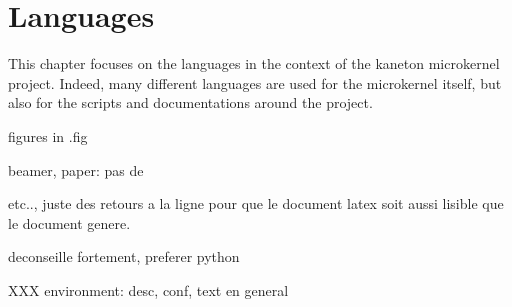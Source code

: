 %
%
%
%
%
%

%
%

\chapter{Languages}
\label{chapter:languages}

This chapter focuses on the languages in the context of the kaneton microkernel
project. Indeed, many different languages are used for the microkernel itself,
but also for the scripts and documentations around the project.

\newpage

%
%











figures in .fig

beamer, %
paper: pas de \par etc.., juste des retours a la ligne pour que le document
latex soit aussi lisible que le document genere.



deconseille fortement, preferer python


XXX environment: desc, conf, text en general

